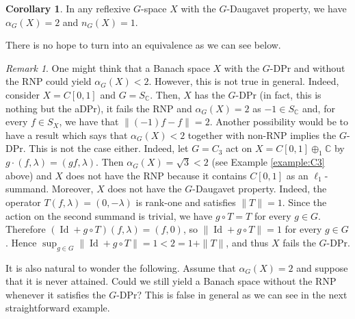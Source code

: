 \documentclass[a4paper,12pt]{amsart}
\theoremstyle{definition}
\newtheorem{corollary}[theorem]{Corollary}
\theoremstyle{definition}
\theoremstyle{remark}
\newtheorem{remark}[theorem]{Remark}
\numberwithin{equation}{section}
\newcommand{\C}{\mathbb{C}}
\DeclareMathOperator{\id}{Id}
\newcommand{\<}{\langle}
\renewcommand{\>}{\rangle}
\begin{document}
	
	
	
	
	\begin{corollary} In any reflexive $G$-space $X$ with the $G$-Daugavet property, we have $\alpha_G(X) = 2$ and $n_G(X) = 1$.
	\end{corollary}
	
	
	
	There is no hope to turn  into an equivalence as we can see below.
	
	\begin{remark} \label{example-of-alpha-equals-sqrt3} One might think that a Banach space $X$ with the $G$-DPr and without the RNP could yield $\alpha_G(X) < 2$. However, this is not true in general. Indeed, consider $X = C[0,1]$ and $G = S_{\C}$. Then, $X$ has the $G$-DPr (in fact, this is nothing but the aDPr), it fails the RNP and $\alpha_G(X)=2$ as $-1 \in S_{\C}$ and, for every $f \in S_X$, we have that $\|(-1)f - f\| = 2$. Another possibility would be to have a result which says that $\alpha_G(X) < 2$ together with non-RNP implies the $G$-DPr. This is not the case either. Indeed, let $G=C_3$ act on $X=C[0,1]\oplus_1 \mathbb C$ by $g\cdot(f,\lambda)=(gf,\lambda)$. Then $\alpha_G(X)=\sqrt3<2$ (see Example \ref{example:C3} above) and $X$ does not have the RNP because it contains $C[0,1]$ as an $\ell_1$-summand. Moreover, $X$ does not have the $G$-Daugavet property. Indeed, the operator $T(f,\lambda)=(0,-\lambda)$ is rank-one and satisfies $\|T\|=1$. Since the action on the second summand is trivial, we have $g\circ T=T$ for every $g\in G$. Therefore $(\id+g\circ T)(f,\lambda)=(f,0)$, so $\|\id+g\circ T\|=1$ for every $g\in G$. Hence $\sup_{g\in G}\|\id+g\circ T\|=1<2=1+\|T\|$, and thus $X$ fails the $G$-DPr.
	\end{remark}
	
	
	
	It is also natural to wonder the following. Assume that $\alpha_G(X) = 2$  and suppose that it is never attained. Could we still yield a Banach space without the RNP whenever it satisfies the $G$-DPr? This is false in general as we can see in the next straightforward example.
	
\end{document}
